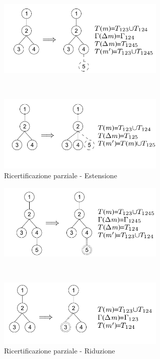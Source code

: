 \documentclass[../main.tex]{subfiles}
\begin{document}
\begin{itemize}
\begin{figure}[H]

 \begin{minipage}[b]{5.5cm}
   \centering
   \includegraphics[width=8cm]{immagini/recert/PartialRecertExt1.png}
 \end{minipage}
 \ \hspace{2mm} \hspace{3mm} \
 \begin{minipage}[b]{5.5cm}
  \centering
   \includegraphics[width=8cm]{immagini/recert/PartialRecertExt2.png}
 \end{minipage}
    \caption{Ricertificazione parziale - Estensione \cite{CertEvolutiva}}\label{fig:PartialRecertExt}
\end{figure}

\begin{figure}[H]
 \begin{minipage}[b]{5.5cm}
   \centering
   \includegraphics[width=8cm]{immagini/recert/PartialRecertRed1.png}
 \end{minipage}
 \ \hspace{2mm} \hspace{3mm} \
 \begin{minipage}[b]{5.5cm}
  \centering
   \includegraphics[width=8cm]{immagini/recert/PartialRecertRed2.png}
 \end{minipage}
    \caption{Ricertificazione parziale - Riduzione \cite{CertEvolutiva}}\label{fig:PartialRecertRed}
\end{figure}


\end{itemize}
\end{document}
